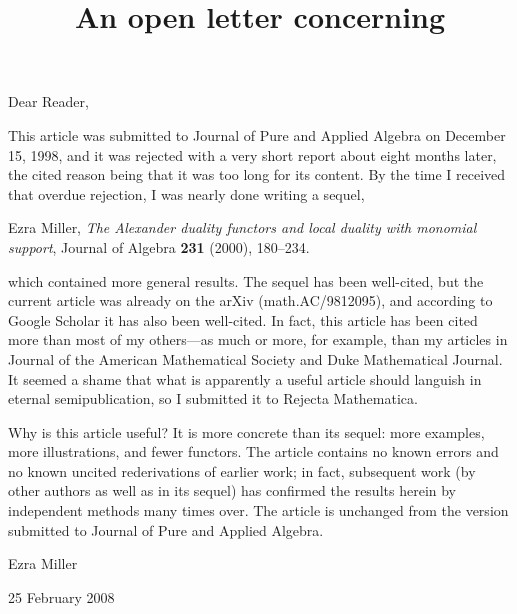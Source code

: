 \documentclass[12pt]{article}
\begin{document}
\title{\bf An open letter concerning \\
\vspace{5mm}{\em Alexander duality for monomial ideals and their resolutions}}
\author{}%
% 
\date{}%

\maketitle
\thispagestyle{empty}

\noindent
Dear Reader,

\medskip

\noindent
This article was submitted to Journal of Pure and Applied
Algebra on December 15, 1998, and it was rejected with a very  
short report about eight months later, the cited reason being
that it was too long for its content.  By the time I received
that overdue rejection, I was nearly done writing a sequel,
\begin{list}{}
\item
  Ezra Miller, \emph{The Alexander duality functors and local
  duality with monomial support}, Journal of Algebra
  \textbf{231} (2000), 180--234.
\end{list}

\bigskip
\noindent
which contained more general results.  The sequel has been
well-cited, but the current article was already on the arXiv
(math.AC/9812095), and according to Google Scholar it has also
been well-cited.  In fact, this article has been cited more
than most of my others---as much or more, for example, than my
articles in Journal of the American Mathematical Society and Duke
Mathematical Journal.  It seemed a shame that what is
apparently a useful article should languish in eternal
semipublication, so I submitted it to Rejecta Mathematica.

\medskip
\noindent
Why is this article useful?  It is more concrete than its
sequel: more examples, more illustrations, and fewer functors.
The article contains no known errors and no known uncited
rederivations of earlier work; in fact, subsequent work (by
other authors as well as in its sequel) has confirmed the
results herein by independent methods many times over.  The
article is unchanged from the version submitted to Journal of
Pure and Applied Algebra.

\bigskip
\bigskip
\noindent\hspace{4in}Ezra Miller

\smallskip
\noindent\hspace{4in}25 February 2008
\end{document}
